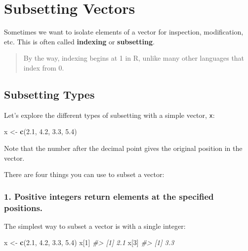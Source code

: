 \documentclass[]{book}
\newenvironment{Shaded}{\begin{snugshade}}{\end{snugshade}}
\newcommand{\KeywordTok}[1]{\textcolor[rgb]{0.13,0.29,0.53}{\textbf{#1}}}
\newcommand{\DecValTok}[1]{\textcolor[rgb]{0.00,0.00,0.81}{#1}}
\newcommand{\FloatTok}[1]{\textcolor[rgb]{0.00,0.00,0.81}{#1}}
\newcommand{\StringTok}[1]{\textcolor[rgb]{0.31,0.60,0.02}{#1}}
\newcommand{\CommentTok}[1]{\textcolor[rgb]{0.56,0.35,0.01}{\textit{#1}}}
\newcommand{\NormalTok}[1]{#1}
\begin{document}
\section{Subsetting Vectors}\label{subsetting-vectors}

Sometimes we want to isolate elements of a vector for inspection,
modification, etc. This is often called \textbf{indexing} or
\textbf{subsetting}.

\begin{quote}
By the way, indexing begins at 1 in R, unlike many other languages that
index from 0.
\end{quote}

\subsection{Subsetting Types}\label{subsetting-types}

Let's explore the different types of subsetting with a simple vector,
\texttt{x}:

\begin{Shaded}
\begin{Highlighting}[]
\NormalTok{x <-}\StringTok{ }\KeywordTok{c}\NormalTok{(}\FloatTok{2.1}\NormalTok{, }\FloatTok{4.2}\NormalTok{, }\FloatTok{3.3}\NormalTok{, }\FloatTok{5.4}\NormalTok{)}
\end{Highlighting}
\end{Shaded}

Note that the number after the decimal point gives the original position
in the vector.

There are four things you can use to subset a vector:

\subsubsection*{\texorpdfstring{1. \textbf{Positive integers} return
elements at the specified
positions.}{1. Positive integers return elements at the specified positions.}}\label{positive-integers-return-elements-at-the-specified-positions.}

The simplest way to subset a vector is with a single integer:

\begin{Shaded}
\begin{Highlighting}[]
\NormalTok{x <-}\StringTok{ }\KeywordTok{c}\NormalTok{(}\FloatTok{2.1}\NormalTok{, }\FloatTok{4.2}\NormalTok{, }\FloatTok{3.3}\NormalTok{, }\FloatTok{5.4}\NormalTok{)}
\NormalTok{x[}\DecValTok{1}\NormalTok{]}
\CommentTok{#> [1] 2.1}
\NormalTok{x[}\DecValTok{3}\NormalTok{]}
\CommentTok{#> [1] 3.3}
\end{Highlighting}
\end{Shaded}
\end{document}
